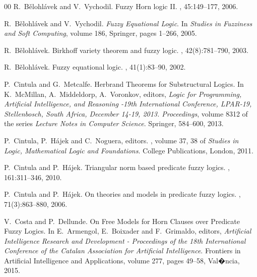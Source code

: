 \documentclass{IOS-Book-Article}
\begin{document}
{\begin{thebibliography}{00}
R.~B\v{e}lohl\'avek and V.~Vychodil. 
\newblock Fuzzy Horn logic II.
, 45:149--177, 
2006.




R.~B\v{e}lohl\'avek and V.~Vychodil.  
\newblock \emph{Fuzzy Equational Logic}. In \emph{Studies in Fuzziness and Soft Computing},
\newblock volume 186, Springer, pages 1--266, 2005.


R.~B\v{e}lohl\'avek. 
\newblock Birkhoff variety theorem and fuzzy logic. 
, 42(8):781--790, 
2003.


R.~B\v{e}lohl\'avek. 
\newblock Fuzzy equational logic. 
, 41(1):83--90, 
2002.



P.~Cintula and G.~Metcalfe.
\newblock Herbrand Theorems for Substructural Logics. In K.~McMillan, A.~Middeldorp, A.~Voronkov, editors, \emph{Logic for Programming, Artificial Intelligence, and Reasoning -19th International Conference, LPAR-19, Stellenbosch, South Africa, December 14-19, 2013. Proceedings}, volume 8312 of the series 
\newblock \emph{Lecture Notes in Computer Science}. 
\newblock  Springer, 584--600, 
2013.


P.~Cintula, P.~H\'ajek and C.~Noguera, editors.
, volume 37, 38 of
\newblock \emph{Studies in Logic, Mathematical Logic and Foundations}. College
Publications, London, 2011.

 P.~Cintula and P.~H\'ajek. 
\newblock  Triangular norm based predicate fuzzy logics.
, 161:311--346, 2010.


 P.~Cintula and P.~H\'ajek. 
\newblock  On theories and models in predicate fuzzy logics.
, 71(3):863--880, 2006.

V.~Costa and P.~Dellunde. 
\newblock On Free Models for Horn Clauses over Predicate Fuzzy Logics. 
\newblock In E.~Armengol, E.~Boixader and F.~Grimaldo, editors, \emph{Artificial Intelligence Research and Development - Proceedings of
  the 18th International Conference of the Catalan Association for Artificial
  Intelligence}. Frontiers in Artificial Intelligence and Applications, volume 277, pages 49--58, Val{�}ncia, 2015.



\end{thebibliography}}
\end{document}
